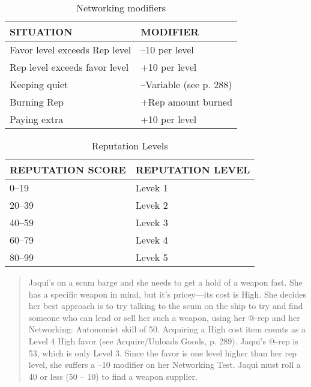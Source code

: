 \begin{table} \caption{Networking modifiers} \begin{tabular}{|l|l|} \hline

SITUATION &MODIFIER \\ \hline

Favor level exceeds Rep level &–10 per level \\ \hline

Rep level exceeds favor level &+10 per level \\ \hline

Keeping quiet &–Variable (see p. 288) \\ \hline

Burning Rep &+Rep amount burned \\ \hline

Paying extra &+10 per level \\ \hline

\end{tabular} \end{table} 

\begin{table} \caption{Reputation Levels} \begin{tabular}{|l|l|} \hline

REPUTATION SCORE &REPUTATION LEVEL \\ \hline

0–19 &Levek 1 \\ \hline

20–39 &Levek 2 \\ \hline

40–59 &Levek 3 \\ \hline

60–79 &Levek 4 \\ \hline

80–99 &Levek 5 \\ \hline

\end{tabular} \end{table} 

\begin{quotation} Jaqui’s on a scum barge and she needs to get a hold of a weapon fast. She has a specific weapon in mind, but it’s pricey—its cost is High. She decides her best approach is to try talking to the scum on the ship to try and find someone who can lend or sell her such a weapon, using her @-rep and her Networking: Autonomist skill of 50. Acquiring a High cost item counts as a Level 4 High favor (see Acquire/Unloads Goods, p. 289). Jaqui’s @-rep is 53, which is only Level 3. Since the favor is one level higher than her rep level, she suffers a –10 modifier on her Networking Test. Jaqui must roll a 40 or less (50 – 10) to find a weapon supplier. \end{quotation} 





